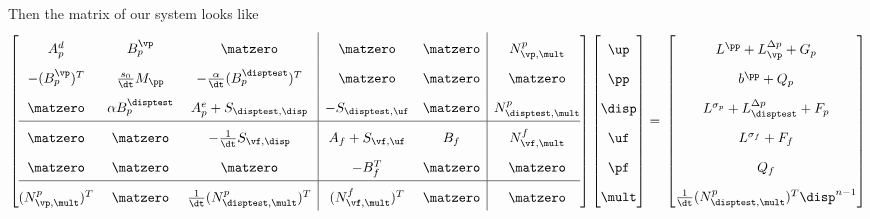 \documentclass{article}
\begin{document}
Then the matrix of our system looks like
\[ \renewcommand{\arraystretch}{1.8}
  \left[\begin{array}{@{}ccc|cc|c@{}}
          
          A^d_p & B^{\vp}_p & \matzero & \matzero & \matzero & N^p_{\vp, \mult} \\ %
          - (B^{\vp}_p)^T & \frac {s_0}{\dt} M_{\pp} & - \frac{\alpha}{\dt} (B^{\disptest}_p)^T & \matzero & \matzero & \matzero\\ %
          \matzero & \alpha B^{\disptest}_p & A^e_p + S_{\disptest, \disp} & - S_{\disptest, \uf} & \matzero & N^p_{\disptest, \mult}\\ %
          \hline
          \matzero & \matzero & - \frac 1 {\dt} S_{\vf, \disp} & A_f + S_{\vf, \uf} & B_f & N^f_{\vf, \mult}\\ %
          \matzero & \matzero & \matzero & -B_f^T & \matzero & \matzero \\ %
          \hline
          (N^p_{\vp, \mult})^T & \matzero & \frac 1 {\dt} (N^p_{\disptest, \mult})^T & (N^f_{\vf, \mult})^T & \matzero & \matzero \\ %

        \end{array}\right]
      \left[\begin{array}{@{}c@{}}
                \up \\
                \pp \\
                \disp \\
                \uf \\
                \pf \\
                \mult
            \end{array}\right]
          = \newline
                      \left[\begin{array}{@{}c@{}}
                L^{\pp} + L_{\vp}^{\Delta p} + G_p\\
                              b^{\pp}  + Q_p \\
                              L^{\sigma_p} + L_{\disptest}^{\Delta p} + F_p\\
                L^{\sigma_f} + F_f\\
                Q_f \\
                \frac 1 {\dt} (N^p_{\disptest, \mult})^T \disp^{n-1} \\
        \end{array}\right]
    \]
\end{document}
